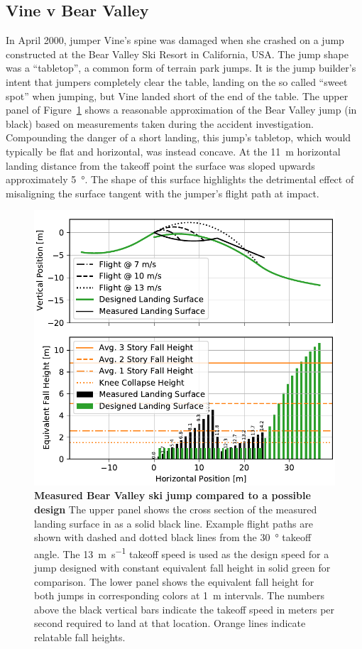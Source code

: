 \documentclass{article}
\begin{document}
\subsection{Vine v Bear Valley}
%
In April 2000, jumper Vine's spine was damaged when she crashed on a
jump constructed at the Bear Valley Ski Resort in California, USA. The jump
shape was a ``tabletop'', a common form of terrain park jumps.
It is the jump builder's intent that jumpers completely clear the table, landing
on the so called ``sweet spot'' when jumping, but Vine landed short of the
end of the table. The upper panel of
Figure~\ref{fig:vine-v-bear-valley} shows a reasonable approximation of the
Bear Valley jump (in black) based on measurements taken during 
the accident investigation. Compounding the danger of a short landing, this jump's
tabletop, which would typically be flat and horizontal, was instead concave.  At the
11~\si{\meter} horizontal landing distance from the takeoff point the surface
was sloped upwards approximately 5~\si{\degree}.  The shape of this surface highlights the detrimental
effect of misaligning the surface tangent with the jumper's flight path at
impact.
%
\begin{figure}
  \centering
  \includegraphics[width=5.25in]{figures/vine-v-bear-valley.pdf}
  \caption{\textbf{Measured Bear Valley ski jump compared to a possible design}
  The upper panel shows the cross section of the measured landing surface in as
  a solid black line. Example flight paths are shown with dashed and dotted
  black lines from the 30~\si{\degree} takeoff angle. The
  13~\si{\meter\per\second} takeoff speed is used as the design speed for a
  jump designed with constant equivalent fall height in solid green for
  comparison. The lower panel shows the equivalent fall height for both jumps
  in corresponding colors at 1~\si{\meter} intervals. The numbers above the
  black vertical bars indicate the takeoff speed in meters per second required
  to land at that location. Orange lines indicate relatable fall heights.}
  \label{fig:vine-v-bear-valley}
\end{figure}
\end{document}
